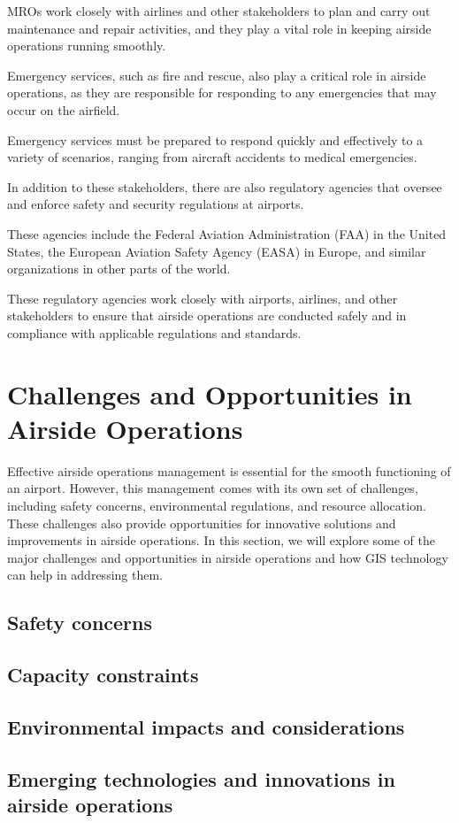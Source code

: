     MROs work closely with airlines and other stakeholders to plan and carry out maintenance and repair activities, and they play a vital role in keeping airside operations running smoothly.
    
    Emergency services, such as fire and rescue, also play a critical role in airside operations, as they are responsible for responding to any emergencies that may occur on the airfield.
    
    Emergency services must be prepared to respond quickly and effectively to a variety of scenarios, ranging from aircraft accidents to medical emergencies.
    
    In addition to these stakeholders, there are also regulatory agencies that oversee and enforce safety and security regulations at airports.
    
    These agencies include the Federal Aviation Administration (FAA) in the United States, the European Aviation Safety Agency (EASA) in Europe, and similar organizations in other parts of the world.
    
    These regulatory agencies work closely with airports, airlines, and other stakeholders to ensure that airside operations are conducted safely and in compliance with applicable regulations and standards.

\section{Challenges and Opportunities in Airside Operations}

Effective airside operations management is essential for the smooth functioning of an airport. However, this management comes with its own set of challenges, including safety concerns, environmental regulations, and resource allocation. These challenges also provide opportunities for innovative solutions and improvements in airside operations. In this section, we will explore some of the major challenges and opportunities in airside operations and how GIS technology can help in addressing them.

    \subsection{Safety concerns}
    \subsection{Capacity constraints}
    \subsection{Environmental impacts and considerations}
    \subsection{Emerging technologies and innovations in airside operations}

